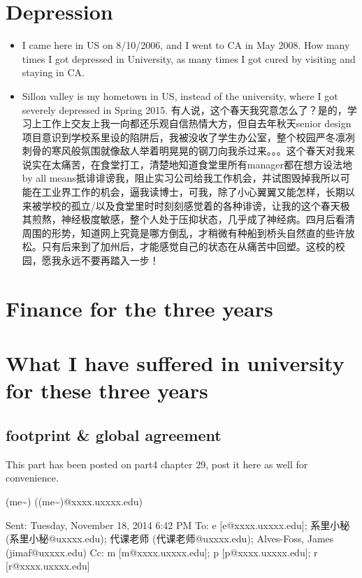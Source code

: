 \documentclass[9pt,b5paper]{article}
\begin{document}
\section{Depression}
\label{sec-4}
\begin{itemize}
\item I came here in US on 8/10/2006, and I went to CA in May 2008. How many times I got depressed in University, as many times I got cured by visiting and staying in CA.
\item Sillon valley is my hometown in US, instead of the university, where I got severely depressed in Spring 2015. 有人说，这个春天我究意怎么了？是的，学习上工作上交友上我一向都还乐观自信热情大方，但自去年秋天senior design项目意识到学校系里设的陷阱后，我被没收了学生办公室，整个校园严冬凛冽刺骨的寒风般氛围就像敌人举着明晃晃的钢刀向我杀过来。。。这个春天对我来说实在太痛苦，在食堂打工，清楚地知道食堂里所有manager都在想方设法地by all means抵诽诽谤我，阻止实习公司给我工作机会，并试图毁掉我所以可能在工业界工作的机会，逼我读博士，可我，除了小心翼翼又能怎样，长期以来被学校的孤立/以及食堂里时时刻刻感觉着的各种诽谤，让我的这个春天极其煎熬，神经极度敏感，整个人处于压抑状态，几乎成了神经病。四月后看清周围的形势，知道网上究竟是哪方倒乱，才稍微有种船到桥头自然直的些许放松。只有后来到了加州后，才能感觉自己的状态在从痛苦中回塑。这校的校园，愿我永远不要再踏入一步！
\end{itemize}

\section{Finance for the three years}
\label{sec-5}


\section{What I have suffered in university for these three years}
\label{sec-6}
\subsection{footprint \& global agreement}
\label{sec-6-1}
This part has been posted on part4 chapter 29, post it here as well for convenience. 

(me\textasciitilde{}) ((me\textasciitilde{})@xxxx.uxxxx.edu)

Sent:        Tuesday, November 18, 2014 6:42 PM
To:        
e [e@xxxx.uxxxx.edu]; 系里小秘 (系里小秘@uxxxx.edu); 代课老师 (代课老师@uxxxx.edu); Alves-Foss, James (jimaf@uxxxx.edu)
Cc:        
m [m@xxxx.uxxxx.edu]; p [p@xxxx.uxxxx.edu]; r [r@xxxx.uxxxx.edu]
\end{document}
